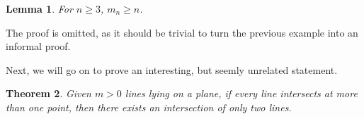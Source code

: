 \documentclass[a4paper, 12pt]{article}
\newtheorem{theorem}{Theorem}
\newtheorem{lemma}[theorem]{Lemma}
\begin{document}
\begin{lemma}
\label{theorem:lower_bound}
For $n\geq3$, $m_n\geq n$.
\end{lemma}

The proof is omitted, as it should be trivial to turn the previous example into an informal proof.

Next, we will go on to prove an interesting, but seemly unrelated statement.

\begin{theorem}
\label{theorem:three_intersection}
Given $m>0$ lines lying on a plane, if every line intersects at more than one point, then there exists an intersection of only two lines.
\end{theorem}
\end{document}
